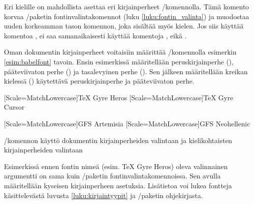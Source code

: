 Eri kielille on mahdollista asettaa eri kirjainperheet \-/komennolla. Tämä komento korvaa
\-/paketin fontinvalintakomennot (luku
\ref{luku:fontin_valinta}) ja muodostaa uuden korkeamman tason komennon,
joka sisältää myös kielen. Jos siis käyttää komentoa , ei saa samanaikaisesti käyttää komentoja ,  eikä .

Oman dokumentin kirjainperheet voitaisiin määrittää \-/komennolla esimerkin \ref{esim:babelfont} tavoin. Ensin
esimerkissä määritellään peruskirjainperhe (), pääteviivaton
perhe () ja tasalevyinen perhe (). Sen jälkeen
määritellään kreikan kielessä () käytettävä
peruskirjainperhe ja pääteviivaton perhe.

\begin{esimerkki*}
\begin{koodilohko}
  [Scale=MatchLowercase]{TeX Gyre Heros}
  [Scale=MatchLowercase]{TeX Gyre Cursor}

  [Scale=MatchLowercase]{GFS Artemisia}
  [Scale=MatchLowercase]{GFS Neohellenic}
\end{koodilohko}
\caption{\-/komennon käyttö dokumentin
  kirjainperheiden valintaan ja kielikohtaisten kirjainperheiden
  valintaan}
\label{esim:babelfont}
\end{esimerkki*}

Esimerkissä ennen fontin nimeä (esim. TeX Gyre Heros) oleva valinnainen
argumentti on sama kuin \-/paketin
fontinvalintakomennoissa. Sen avulla määritellään kyseisen
kirjainperheen asetuksia. Lisätietoa voi lukea fontteja käsittelevästä
luvusta \ref{luku:kirjaintyypit} ja \-/paketin
ohjekirjasta.
